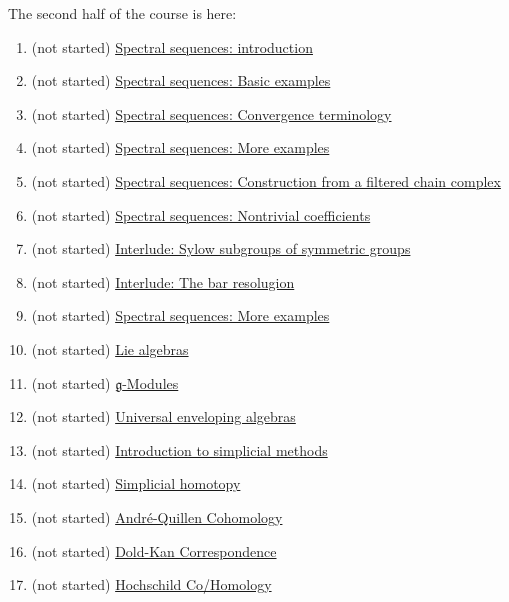 \documentclass{ximera}
\begin{document}
The second half of the course is here:

\begin{enumerate}
\item (not started) \href{/activity/spectralSequencesIntroduction/spectralSequencesIntroduction/}{Spectral sequences: introduction}
\item (not started) \href{/activity/spectralSequencesBasicExamples/spectralSequencesBasicExamples/}{Spectral sequences: Basic examples}
\item (not started) \href{/activity/spectralSequencesConvergenceTerminology/spectralSequencesConvergenceTerminology/}{Spectral sequences: Convergence terminology}
\item (not started) \href{/activity/spectralSequencesMoreExamples/spectralSequencesMoreExamples/}{Spectral sequences: More examples}
\item (not started) \href{/activity/spectralSequencesConstructionFromAFilteredChainComplex/spectralSequencesConstructionFromAFilteredChainComplex/}{Spectral sequences: Construction from a filtered chain complex}
\item (not started) \href{/activity/spectralSequencesNontrivialCoefficients/spectralSequencesNontrivialCoefficients/}{Spectral sequences: Nontrivial coefficients}
\item (not started) \href{/activity/interludeSylowSubgroupsOfSymmetricGroups/interludeSylowSubgroupsOfSymmetricGroups/}{Interlude: Sylow subgroups of symmetric groups}
\item (not started) \href{/activity/interludeTheBarResolugion/interludeTheBarResolugion/}{Interlude: The bar resolugion}
\item (not started) \href{/activity/spectralSequencesMoreExamples/spectralSequencesMoreExamples/}{Spectral sequences: More examples}
\item (not started) \href{/activity/lieAlgebras/lieAlgebras/}{Lie algebras}
\item (not started) \href{/activity/gModules/gModules/}{$\mathfrak{g}$-Modules}
\item (not started) \href{/activity/universalEnvelopingAlgebras/universalEnvelopingAlgebras/}{Universal enveloping algebras}
\item (not started) \href{/activity/introductionToSimplicialMethods/introductionToSimplicialMethods/}{Introduction to simplicial methods}
\item (not started) \href{/activity/simplicialHomotopy/simplicialHomotopy/}{Simplicial homotopy}
\item (not started) \href{/activity/andreQuillenCohomology/andreQuillenCohomology/}{Andr\'e-Quillen Cohomology}
\item (not started) \href{/activity/doldKanCorrespondence/doldKanCorrespondence/}{Dold-Kan Correspondence}
\item (not started) \href{/activity/hochschildCoHomology/hochschildCoHomology/}{Hochschild Co/Homology}

\end{enumerate}
\end{document}

